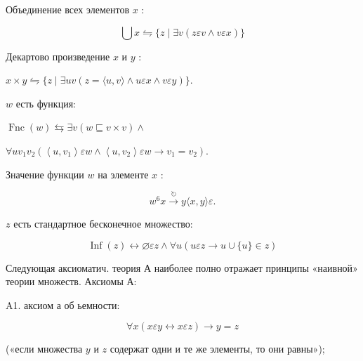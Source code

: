 \documentclass[10pt]{article}
\begin{document}
Объединение всех элементов $x$ :



\[

\bigcup x \leftrightharpoons\{z \mid \exists v(z \varepsilon v \wedge v \varepsilon x)\}

\]



Декартово произведение $x$ и $y$ :



$x \times y \leftrightharpoons\{z \mid \exists u v(z=\langle u, v\rangle \wedge u \varepsilon x \wedge v \varepsilon y)\}$.



$w$ есть функция:



$\operatorname{Fnc}(w) \leftrightarrows \exists v(w \sqsubseteq v \times v) \wedge$



$\forall u v_{1} v_{2}\left(\left\langle u, v_{1}\right\rangle \varepsilon w \wedge\left\langle u, v_{2}\right\rangle \varepsilon w \longrightarrow v_{1}=v_{2}\right)$.



Значение функции $w$ на элементе $x$ :



\[

w^{6} x \stackrel{\circlearrowright}{\longrightarrow} y\langle x, y\rangle \varepsilon .

\]



$z$ есть стандартное бесконечное множество:



\[

\operatorname{Inf}(z) \longleftrightarrow \varnothing \varepsilon z \wedge \forall u(u \varepsilon z \longrightarrow u \cup\{u\} \in z)

\]



Следующая аксиоматич. теория А наиболее полно отражает принципы «наивной» теории множеств. Аксиомы А:



A1. аксиом а об ьемности:



\[

\forall x(x \varepsilon y \leftrightarrow x \varepsilon z) \longrightarrow y=z

\]



(«если множества $y$ и $z$ содержат одни и те же элементы, то они равны»);
\end{document}
